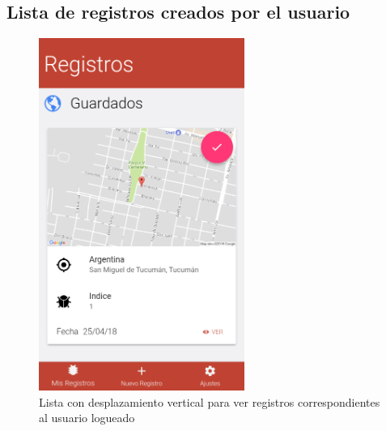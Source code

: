 \begin{itemize}
				\subsection{Lista de registros creados por el usuario}
					\begin{figure}
						\centering
							\includegraphics[width=0.6\textwidth]{Screenshots/registrosLocales.png}
									\caption{Lista con desplazamiento vertical para ver registros correspondientes al usuario logueado}
							\label{fig:registrosLocales}
					\end{figure}


\end{itemize}
